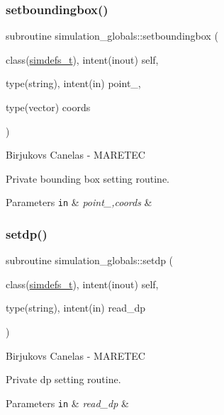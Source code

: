 \subsubsection{\texorpdfstring{setboundingbox()}{setboundingbox()}}
{\footnotesize\ttfamily subroutine simulation\+\_\+globals\+::setboundingbox (\begin{DoxyParamCaption}\item[{class(\mbox{\hyperlink{structsimulation__globals_1_1simdefs__t}{simdefs\+\_\+t}}), intent(inout)}]{self,  }\item[{type(string), intent(in)}]{point\+\_\+,  }\item[{type(vector)}]{coords }\end{DoxyParamCaption})\hspace{0.3cm}{\ttfamily [private]}}



Birjukovs Canelas -\/ M\+A\+R\+E\+T\+EC 

Private bounding box setting routine. 
\begin{DoxyParams}[1]{Parameters}
\mbox{\tt in}  & {\em point\+\_\+,coords} & \\
\hline
\end{DoxyParams}
\mbox{\label{namespacesimulation__globals_a9a8e88c06937b7cf6be9d9bf30f54ba9}} 
\subsubsection{\texorpdfstring{setdp()}{setdp()}}
{\footnotesize\ttfamily subroutine simulation\+\_\+globals\+::setdp (\begin{DoxyParamCaption}\item[{class(\mbox{\hyperlink{structsimulation__globals_1_1simdefs__t}{simdefs\+\_\+t}}), intent(inout)}]{self,  }\item[{type(string), intent(in)}]{read\+\_\+dp }\end{DoxyParamCaption})\hspace{0.3cm}{\ttfamily [private]}}



Birjukovs Canelas -\/ M\+A\+R\+E\+T\+EC 

Private dp setting routine. 
\begin{DoxyParams}[1]{Parameters}
\mbox{\tt in}  & {\em read\+\_\+dp} & \\
\hline
\end{DoxyParams}
\mbox{\label{namespacesimulation__globals_a3ef0462db5a60ac79304cabd2fdd914d}} 
